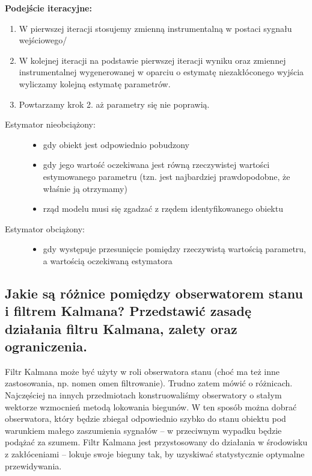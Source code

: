 \textbf{Podejście iteracyjne:}
\begin{enumerate}
    \item W pierwszej iteracji stosujemy zmienną instrumentalną w postaci sygnału wejściowego/
    \item W kolejnej iteracji na podstawie pierwszej iteracji wyniku oraz zmiennej instrumentalnej wygenerowanej w oparciu o estymatę niezakłóconego wyjścia wyliczamy kolejną estymatę parametrów.
    \item Powtarzamy krok 2. aż parametry się nie poprawią.
\end{enumerate}

\begin{description}
    \item[Estymator nieobciążony:]\mbox{}
    \begin{itemize}
        \item gdy obiekt jest odpowiednio pobudzony
        \item gdy jego wartość oczekiwana jest równą rzeczywistej wartości estymowanego parametru (tzn. jest najbardziej prawdopodobne, że właśnie ją otrzymamy)
        \item rząd modelu musi się zgadzać z rzędem identyfikowanego obiektu
    \end{itemize}
    \item[Estymator obciążony:]\mbox{}
    \begin{itemize}
        \item gdy występuje przesunięcie pomiędzy rzeczywistą wartością parametru, a wartością oczekiwaną estymatora
    \end{itemize}
\end{description}

\subsection{Jakie są różnice pomiędzy obserwatorem stanu i filtrem Kalmana? Przedstawić zasadę działania filtru Kalmana, zalety oraz ograniczenia.}
Filtr Kalmana może być użyty w roli obserwatora stanu (choć ma też inne zastosowania, np. nomen omen filtrowanie). Trudno zatem mówić o różnicach. Najczęściej na innych przedmiotach konstruowaliśmy obserwatory o stałym wektorze wzmocnień metodą lokowania biegunów. W ten sposób można dobrać obserwatora, który będzie zbiegał odpowiednio szybko do stanu obiektu pod warunkiem małego zaszumienia sygnałów – w przeciwnym wypadku będzie podążać za szumem. Filtr Kalmana jest przystosowany do działania w środowisku z zakłóceniami – lokuje swoje bieguny tak, by uzyskiwać statystycznie optymalne przewidywania.

